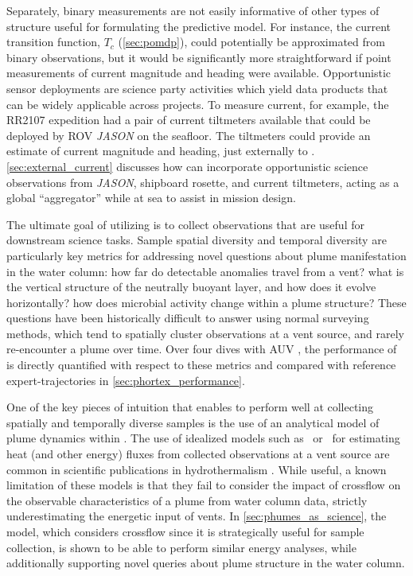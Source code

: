 Separately, binary measurements are not easily informative of other types of structure useful for formulating the \PHUMES predictive model. For instance, the current transition function, $T_c$ (\cref{sec:pomdp}), could potentially be approximated from binary observations, but it would be significantly more straightforward if point measurements of current magnitude and heading were available. Opportunistic sensor deployments are science party activities which yield data products that can be widely applicable across projects. To measure current, for example, the RR2107 expedition had a pair of current tiltmeters available that could be deployed by ROV \emph{JASON} on the seafloor. The tiltmeters could provide an estimate of current magnitude and heading, just externally to \Sentry. \cref{sec:external_current} discusses how \PHUMES can incorporate opportunistic science observations from \emph{JASON}, shipboard rosette, and current tiltmeters, acting as a global ``aggregator'' while at sea to assist in mission design.

The ultimate goal of utilizing \PHORTEX is to collect observations that are useful for downstream science tasks. Sample spatial diversity and temporal diversity are particularly key metrics for addressing novel questions about plume manifestation in the water column: how far do detectable anomalies travel from a vent? what is the vertical structure of the neutrally buoyant layer, and how does it evolve horizontally? how does microbial activity change within a plume structure? These questions have been historically difficult to answer using normal surveying methods, which tend to spatially cluster observations at a vent source, and rarely re-encounter a plume over time. Over four dives with AUV \Sentry, the performance of \PHORTEX is directly quantified with respect to these metrics and compared with reference expert-trajectories in \cref{sec:phortex_performance}.

One of the key pieces of intuition that enables \PHORTEX to perform well at collecting spatially and temporally diverse samples is the use of an analytical model of plume dynamics within \PHUMES. The use of idealized models such as~\cite{morton1956turbulent} or~\cite{speer1989model} for estimating heat (and other energy) fluxes from collected observations at a vent source are common in scientific publications in hydrothermalism \autocite{barreyre2012structure,wilson1996hydrothermal,mittelstaedt2012quantifying,baker1993method,ramondenc2006first}. While useful, a known limitation of these models is that they fail to consider the impact of crossflow on the observable characteristics of a plume from water column data, strictly underestimating the energetic input of vents. In \cref{sec:phumes_as_science}, the \PHUMES model, which considers crossflow since it is strategically useful for sample collection, is shown to be able to perform similar energy analyses, while additionally supporting novel queries about plume structure in the water column.

